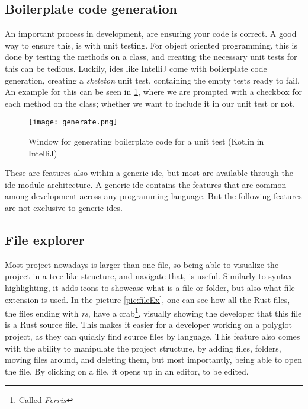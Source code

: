 \subsection{Boilerplate code generation}

An important process in development, are ensuring your code is correct. A good
way to ensure this, is with unit testing. For object oriented programming, this
is done by testing the methods on a class, and creating the necessary unit tests
for this can be tedious. Luckily, \gls*{ide}s like IntelliJ come with
boilerplate code generation, creating a \textit{skeleton} unit test, containing
the empty tests ready to fail. An example for this can be seen in
\ref{pic:generate}, where we are prompted with a checkbox for each method on
the class; whether we want to include it in our unit test or not.

\begin{figure}
  \centering
  \texttt{[image: generate.png]}
  \caption{
    Window for generating boilerplate code for a unit test (Kotlin in
    IntelliJ)
  }
  \label{pic:generate}
\end{figure}

These are features also within a generic \gls*{ide}, but most are available
through the \gls*{ide} module architecture. A generic \gls*{ide} contains the
features that are common among development across any programming language. But
the following features are not exclusive to generic \gls*{ide}s.

\subsection{File explorer}

Most project nowadays is larger than one file, so being able to visualize the
project in a tree-like-structure, and navigate that, is useful. Similarly to
syntax highlighting, it adds icons to showcase what is a file or folder, but
also what file extension is used. In the picture \ref{pic:fileEx}, one can see
how all the Rust files, the files ending with \textit{rs}, have a crab\footnote{Called \textit{Ferris}},
visually showing the developer that this file is a Rust source file. This makes
it easier for a developer working on a polyglot project, as they can quickly
find source files by language. This feature also comes with the ability to
manipulate the project structure, by adding files, folders, moving files around,
and deleting them, but most importantly, being able to open the file. By
clicking on a file, it opens up in an editor, to be edited.


